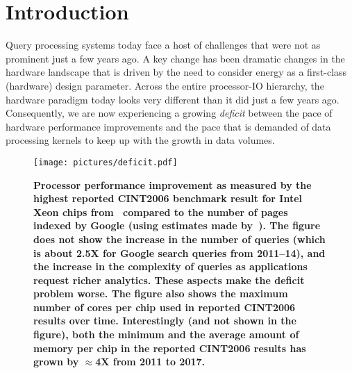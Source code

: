 
\section{Introduction}
Query processing systems today face a host of challenges that were not as prominent just a few years ago. A key change has been dramatic changes in the hardware landscape that is driven by the need to consider energy as a first-class (hardware) design parameter. Across the entire processor-IO hierarchy, the hardware paradigm today looks very different than it did just a few years ago. Consequently, we are now experiencing a growing \textit{deficit} between the pace of hardware performance improvements and the pace that is demanded of data processing kernels to keep up with the growth in data volumes.

\begin{figure}
\centering
   \texttt{[image: pictures/deficit.pdf]}
   \vspace*{-2em}
   \caption{\textbf{Processor performance improvement as measured by the highest reported CINT2006 benchmark result for Intel Xeon chips from~\cite{cpu2006} compared to the number of pages indexed by Google (using estimates made by~\cite{google-pages-db}). The figure does not show the increase in the number of queries (which is about 2.5X for Google search queries from 2011--14), and the increase in the complexity of queries as applications request richer analytics. These aspects make the deficit problem worse. The figure also shows the maximum number of cores per chip used in reported CINT2006 results over time. Interestingly (and not shown in the figure), both the minimum and the average amount of memory per chip in the reported CINT2006 results has grown by $\approx$4X from 2011 to 2017.}}
   \label{fig-deficit}
\end{figure}

